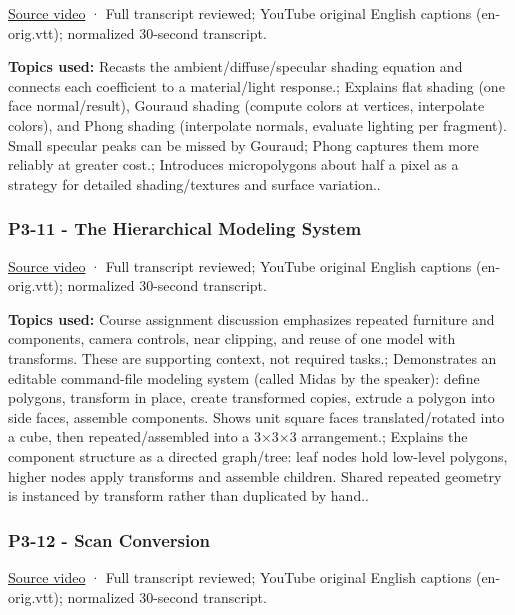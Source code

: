 \href{https://www.youtube.com/watch?v=Is6D5rnWEvs}{Source video} · Full transcript reviewed; YouTube original English captions (en-orig.vtt); normalized 30-second transcript.

\textbf{Topics used:} Recasts the ambient/diffuse/specular shading equation and connects each coefficient to a material/light response.; Explains flat shading (one face normal/result), Gouraud shading (compute colors at vertices, interpolate colors), and Phong shading (interpolate normals, evaluate lighting per fragment). Small specular peaks can be missed by Gouraud; Phong captures them more reliably at greater cost.; Introduces micropolygons about half a pixel as a strategy for detailed shading/textures and surface variation..

\subsubsection{P3-11 - The Hierarchical Modeling System}\label{04-visual-computing-ii-ch036-p3-11---the-hierarchical-modeling-system}

\href{https://www.youtube.com/watch?v=D8ZYHXom0qk}{Source video} · Full transcript reviewed; YouTube original English captions (en-orig.vtt); normalized 30-second transcript.

\textbf{Topics used:} Course assignment discussion emphasizes repeated furniture and components, camera controls, near clipping, and reuse of one model with transforms. These are supporting context, not required tasks.; Demonstrates an editable command-file modeling system (called Midas by the speaker): define polygons, transform in place, create transformed copies, extrude a polygon into side faces, assemble components. Shows unit square faces translated/rotated into a cube, then repeated/assembled into a 3×3×3 arrangement.; Explains the component structure as a directed graph/tree: leaf nodes hold low-level polygons, higher nodes apply transforms and assemble children. Shared repeated geometry is instanced by transform rather than duplicated by hand..

\subsubsection{P3-12 - Scan Conversion}\label{04-visual-computing-ii-ch036-p3-12---scan-conversion}

\href{https://www.youtube.com/watch?v=23HEwdcphg4}{Source video} · Full transcript reviewed; YouTube original English captions (en-orig.vtt); normalized 30-second transcript.

